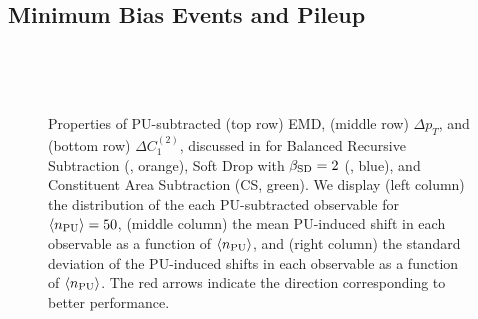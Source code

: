 \documentclass[letterpaper,11pt]{article}
\begin{document}
\subsection{Minimum Bias Events and Pileup}
\label{sec:pileup}


\begin{figure}[p]
\centerline{
} %
~\\
\centerline{
} %
~\\
\centerline{
} %
\caption{
    Properties of PU-subtracted (top row) EMD, (middle row) \(\Delta p_T\), and (bottom row) \(\Delta C_1^{(2)}\), discussed in  for Balanced Recursive Subtraction (, orange), Soft Drop with \(\beta_{\rm SD} = 2\) (, blue), and Constituent Area Subtraction (CS, green).
    We display (left column) the distribution of the each PU-subtracted observable for \(\langle n_{\rm PU}\rangle = 50\), (middle column) the mean PU-induced shift in each observable as a function of \(\langle n_{\rm PU}\rangle\), and (right column) the standard deviation of the PU-induced shifts in each observable as a function of \(\langle n_{\rm PU}\rangle\).
    The red arrows indicate the direction corresponding to better performance.
}
\label{fig:pu_response}
\centering
\end{figure}
\end{document}
